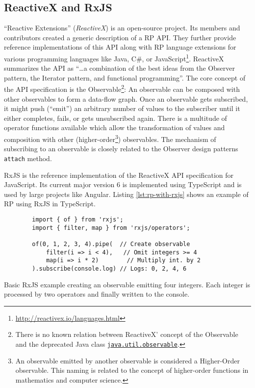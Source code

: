 \documentclass[sigplan,screen,review]{acmart}
\begin{document}
\subsection{ReactiveX and RxJS}

``Reactive Extensions'' (\emph{ReactiveX}) is an open-source project. Its members and contributors created a generic description of a RP API. They further provide reference implementations of this API along with RP language extensions for various programming languages like Java, C\#, or JavaScript\footnote{\url{http://reactivex.io/languages.html}}. ReactiveX summarizes the API as ``\dots a combination of the best ideas from the Observer pattern, the Iterator pattern, and functional programming''\cite{reactivex}. The core concept of the API specification is the Observable\footnote{There is no known relation between ReactiveX' concept of the Observable and the deprecated Java class \href{https://docs.oracle.com/en/java/javase/11/docs/api/java.base/java/util/Observable.html}{\texttt{java.util.observable}}.}: An observable can be composed with other observables to form a data-flow graph. Once an observable gets subscribed, it might push (``emit'') an arbitrary number of values to the subscriber until it either completes, fails, or gets unsubscribed again. There is a multitude of operator functions available which allow the transformation of values and composition with other (higher-order\footnote{An observable emitted by another observable is considered a Higher-Order observable. This naming is related to the concept of higher-order functions in mathematics and computer science.}) observables. The mechanism of subscribing to an observable is closely related to the Observer design patterns \texttt{attach} method.

RxJS\cite{rxjs} is the reference implementation of the ReactiveX API specification for JavaScript. Its current major version 6 is implemented using TypeScript and is used by large projects like Angular\cite{angualrrxjs}. Listing \ref{lst:rp-with-rxjs} shows an example of RP using RxJS in TypeScript.

\begin{listing}
	\begin{verbatim}
		import { of } from 'rxjs';
		import { filter, map } from 'rxjs/operators';

		of(0, 1, 2, 3, 4).pipe(  // Create observable
			filter(i => i < 4),	  // Omit integers >= 4
			map(i => i * 2)        // Multiply int. by 2
		).subscribe(console.log) // Logs: 0, 2, 4, 6
	\end{verbatim}
	\caption{Basic RxJS example creating an observable emitting four integers. Each integer is processed by two operators and finally written to the console.}
	\label{lst:rp-with-rxjs}
\end{listing}
\end{document}
